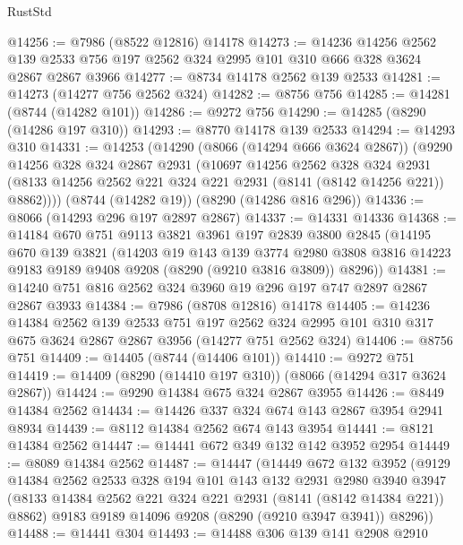 \begin{lexlean}{RustStd}
\begin{coremodule}
@14256 := @7986 (@8522 @12816) @14178
@14273 := @14236
    @14256
    @2562
    @139
    @2533
    @756
    @197
    @2562
    @324
    @2995
    @101
    @310
    @666
    @328
    @3624
    @2867
    @2867
    @3966
@14277 := @8734 @14178 @2562 @139 @2533
@14281 := @14273 (@14277 @756 @2562 @324)
@14282 := @8756 @756
@14285 := @14281 (@8744 (@14282 @101))
@14286 := @9272 @756
@14290 := @14285 (@8290 (@14286 @197 @310))
@14293 := @8770 @14178 @139 @2533
@14294 := @14293 @310
@14331 := @14253
    (@14290
      (@8066 (@14294 @666 @3624 @2867))
      (@9290
        @14256
        @328
        @324
        @2867
        @2931
        (@10697
          @14256
          @2562
          @328
          @324
          @2931
          (@8133 @14256 @2562 @221 @324 @221 @2931 (@8141 (@8142 @14256 @221)) @8862))))
    (@8744 (@14282 @19))
    (@8290 (@14286 @816 @296))
@14336 := @8066 (@14293 @296 @197 @2897 @2867)
@14337 := @14331 @14336
@14368 := @14184
    @670
    @751
    @9113
    @3821
    @3961
    @197
    @2839
    @3800
    @2845
    (@14195
      @670
      @139
      @3821
      (@14203
        @19
        @143
        @139
        @3774
        @2980
        @3808
        @3816
        @14223
        @9183
        @9189
        @9408
        @9208
        (@8290 (@9210 @3816 @3809))
        @8296))
@14381 := @14240 @751 @816 @2562 @324 @3960 @19 @296 @197 @747 @2897 @2867 @2867 @3933
@14384 := @7986 (@8708 @12816) @14178
@14405 := @14236
    @14384
    @2562
    @139
    @2533
    @751
    @197
    @2562
    @324
    @2995
    @101
    @310
    @317
    @675
    @3624
    @2867
    @2867
    @3956
    (@14277 @751 @2562 @324)
@14406 := @8756 @751
@14409 := @14405 (@8744 (@14406 @101))
@14410 := @9272 @751
@14419 := @14409 (@8290 (@14410 @197 @310)) (@8066 (@14294 @317 @3624 @2867))
@14424 := @9290 @14384 @675 @324 @2867 @3955
@14426 := @8449 @14384 @2562
@14434 := @14426 @337 @324 @674 @143 @2867 @3954 @2941 @8934
@14439 := @8112 @14384 @2562 @674 @143 @3954
@14441 := @8121 @14384 @2562
@14447 := @14441 @672 @349 @132 @142 @3952 @2954
@14449 := @8089 @14384 @2562
@14487 := @14447
    (@14449
      @672
      @132
      @3952
      (@9129
        @14384
        @2562
        @2533
        @328
        @194
        @101
        @143
        @132
        @2931
        @2980
        @3940
        @3947
        (@8133 @14384 @2562 @221 @324 @221 @2931 (@8141 (@8142 @14384 @221)) @8862)
        @9183
        @9189
        @14096
        @9208
        (@8290 (@9210 @3947 @3941))
        @8296))
@14488 := @14441 @304
@14493 := @14488 @306 @139 @141 @2908 @2910

\end{coremodule}
\end{lexlean}
